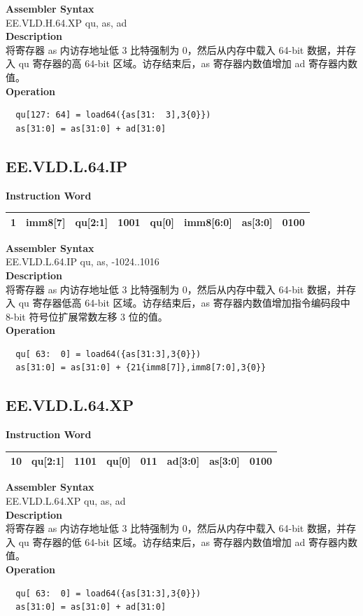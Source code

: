 \textbf{Assembler Syntax} \\
EE.VLD.H.64.XP qu, as, ad \\
\textbf{Description} \\
将寄存器 as 内访存地址低 3 比特强制为 0，然后从内存中载入 64-bit 数据，并存入 qu 寄存器的高 64-bit 区域。访存结束后，as 寄存器内数值增加 ad 寄存器内数值。\\
\textbf{Operation}
\begin{lstlisting}
  qu[127: 64] = load64({as[31:  3],3{0}})
  as[31:0] = as[31:0] + ad[31:0]
\end{lstlisting}

\clearpage
\subsection{EE.VLD.L.64.IP}\label{instruction:EEVLDL64IP}
\setlength\tabcolsep{6pt}
\textbf{Instruction Word} \\
\begin{tabular}{|c|c|c|c|c|c|c|c|}
	\hline
	1 & imm8[7] & qu[2:1] & 1001 & qu[0] & imm8[6:0] & as[3:0] & 0100 \\
	\hline
\end{tabular}

\textbf{Assembler Syntax} \\
EE.VLD.L.64.IP qu, as, -1024..1016 \\
\textbf{Description} \\
将寄存器 as 内访存地址低 3 比特强制为 0，然后从内存中载入 64-bit 数据，并存入 qu 寄存器低高 64-bit 区域。访存结束后，as 寄存器内数值增加指令编码段中 8-bit 符号位扩展常数左移 3 位的值。\\
\textbf{Operation}
\begin{lstlisting}
  qu[ 63:  0] = load64({as[31:3],3{0}})
  as[31:0] = as[31:0] + {21{imm8[7]},imm8[7:0],3{0}}
\end{lstlisting}

\clearpage
\subsection{EE.VLD.L.64.XP}\label{instruction:EEVLDL64XP}
\setlength\tabcolsep{6pt}
\textbf{Instruction Word} \\
\begin{tabular}{|c|c|c|c|c|c|c|c|}
	\hline
	10 & qu[2:1] & 1101 & qu[0] & 011 & ad[3:0] & as[3:0] & 0100 \\
	\hline
\end{tabular}

\textbf{Assembler Syntax} \\
EE.VLD.L.64.XP qu, as, ad \\
\textbf{Description} \\
将寄存器 as 内访存地址低 3 比特强制为 0，然后从内存中载入 64-bit 数据，并存入 qu 寄存器的低 64-bit 区域。访存结束后，as 寄存器内数值增加 ad 寄存器内数值。\\
\textbf{Operation}
\begin{lstlisting}
  qu[ 63:  0] = load64({as[31:3],3{0}})
  as[31:0] = as[31:0] + ad[31:0]
\end{lstlisting}

